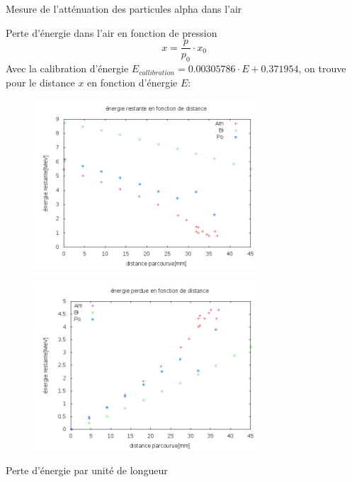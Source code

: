 \documentclass[a4paper,11pt]{scrartcl}
\begin{document}
\begin{section}{Mesure de l'atténuation des particules alpha dans l'air}
\begin{subsection}{Perte d'énergie dans l'air en fonction de pression}
   \begin{equation*}
    x=\frac{p}{p_0}\cdot x_0
   \end{equation*}
\newpage
   Avec la calibration d'énergie $E_{callibration}= 0.00305786  \cdot E +0.371954 $, on trouve pour le distance $x$ en fonction d'énergie $E$:
   \begin{figure}[h]
    \begin{center}
     \includegraphics[width=0.75\textwidth]{Bilder/energie_restante.png}
    \end{center}
   \end{figure}
   \begin{figure}[h]
    \begin{center}
     \includegraphics[width=0.75\textwidth]{Bilder/energie_perdue.png}
    \end{center}
   \end{figure}
  \end{subsection}
  
  \begin{subsection}{Perte d'énergie par unité de longueur}
  \end{subsection}
 \end{section}
\end{document}
